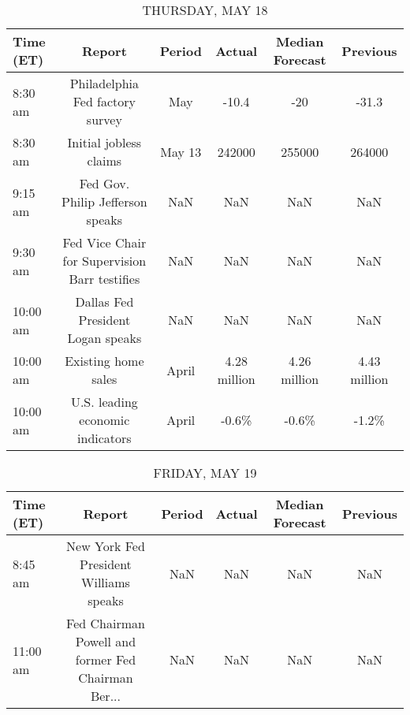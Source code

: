 \documentclass{article}%
\begin{document}
%


\begin{table}[htbp]%
\caption{THURSDAY, MAY 18}%
\centering%
\begin{adjustbox}{width=1\textwidth}%
\begin{tabular}{lccccc}
\toprule
Time (ET) &                                        Report & Period &       Actual & Median Forecast &     Previous \\
\midrule
  8:30 am &               Philadelphia Fed factory survey &    May &        -10.4 &             -20 &        -31.3 \\
  8:30 am &                        Initial jobless claims & May 13 &       242000 &          255000 &       264000 \\
  9:15 am &              Fed Gov. Philip Jefferson speaks &    NaN &          NaN &             NaN &          NaN \\
  9:30 am & Fed Vice Chair for Supervision Barr testifies &    NaN &          NaN &             NaN &          NaN \\
 10:00 am &             Dallas Fed President Logan speaks &    NaN &          NaN &             NaN &          NaN \\
 10:00 am &                           Existing home sales &  April & 4.28 million &    4.26 million & 4.43 million \\
 10:00 am &              U.S. leading economic indicators &  April &        -0.6\% &           -0.6\% &        -1.2\% \\
\bottomrule
\end{tabular}
%
\end{adjustbox}%
\end{table}

%


\begin{table}[htbp]%
\caption{FRIDAY, MAY 19}%
\centering%
\begin{adjustbox}{width=1\textwidth}%
\begin{tabular}{lccccc}
\toprule
Time (ET) &                                             Report & Period & Actual & Median Forecast & Previous \\
\midrule
  8:45 am &             New York Fed President Williams speaks &    NaN &    NaN &             NaN &      NaN \\
 11:00 am & Fed Chairman Powell and former Fed Chairman Ber... &    NaN &    NaN &             NaN &      NaN \\
\bottomrule
\end{tabular}
%
\end{adjustbox}%
\end{table}
\end{document}
